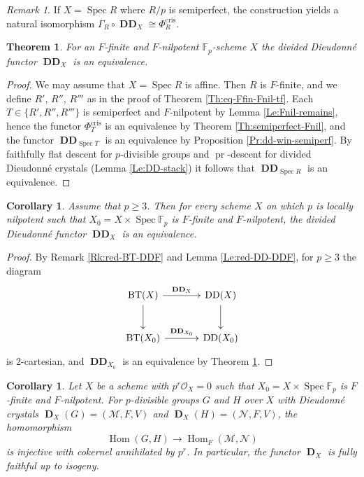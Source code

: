\documentclass[a4paper,11pt]{article}
\theoremstyle{plain}
\newtheorem{Thm}[Lemma]{Theorem}
\newtheorem{Cor}[Lemma]{Corollary}
\theoremstyle{definition}
\theoremstyle{remark}
\newtheorem{Remark}[Lemma]{Remark}
\theoremstyle{definition}
\numberwithin{Lemma}{section}
\numberwithin{Subpoint}{Lemma}
\numberwithin{equation}{section}
\newcommand{\MMM}{\mathcal{M}}
\newcommand{\NNN}{\mathcal{N}}
\newcommand{\OOO}{\mathcal{O}}
\newcommand{\DD}{{\mathbb{D}}}
\newcommand{\FF}{{\mathbb{F}}}
\DeclareMathOperator{\BT}{BT}
\DeclareMathOperator{\Dfun}{\mathbf D} %
\DeclareMathOperator{\DDcat}{DD}
\DeclareMathOperator{\DDfun}{\mathbf {DD}} %
\DeclareMathOperator{\Hom}{Hom}
\DeclareMathOperator{\Spec}{Spec}
\DeclareMathOperator{\cris}{cris}
\newcommand{\nameoftop}{{\operatorname{pr}}}
\newcommand{\chang}[1]{{#1}}
\begin{document}
\begin{Remark}
\chang{If $X=\Spec R$ where $R/p$ is semiperfect, the construction yields a natural isomorphism $\Gamma_R\circ\DDfun_X\cong\Phi_R^{\cris}$.}
\end{Remark}

\begin{Thm}
\label{Th:Ffin-Fnil}
For an $F$-finite and $F$-nilpotent $\FF_p$-scheme $X$
the divided Dieudonn\'e functor\/ $\DDfun_X$ is an equivalence.
\end{Thm}

\begin{proof}
We \chang{may} assume that $X=\Spec R$ \chang{is affine}.
\chang{Then $R$ is $F$-finite, and we define $R'$, $R''$, $R'''$ 
as in the proof of Theorem \ref{Th:eq-Ffin-Fnil-tf}.}
Each $T\in\{R',R'',R'''\}$ 
is semiperfect and $F$-nilpotent by Lemma \ref{Le:Fnil-remains}, 
hence the functor $\Phi_T^{\cris}$ is an equivalence 
by Theorem \ref{Th:semiperfect-Fnil},
and the functor $\DDfun_{\Spec T}$ is an equivalence
by Proposition \ref{Pr:dd-win-semiperf}.
By faithfully flat descent for $p$-divisible groups
and $\nameoftop$-descent for divided Dieudonn\'e crystals
(Lemma \ref{Le:DD-stack}) it follows that $\DDfun_{\Spec R}$
is an equivalence.
\end{proof}

\begin{Cor}
\label{Co:Ffin-Fnil}
Assume that $p\ge 3$.
Then for every scheme $X$ on which $p$ is locally nilpotent 
such that $X_0=X\times\Spec\FF_p$ is $F$-finite and $F$-nilpotent,
the divided Dieudonn\'e functor $\DDfun_X$ is an equivalence.
\end{Cor}

\begin{proof}
By Remark \ref{Rk:red-BT-DDF} and Lemma \ref{Le:red-DD-DDF},
for $p\ge 3$ the diagram
\[
\xymatrix@M+0.2em@C+1em{
\BT(X) \ar[r]^{\DDfun_X} \ar[d] &
\DDcat(X) \ar[d] \\
\BT(X_0) \ar[r]^{\DDfun_{X_0}} &
\DDcat(X_0)
}
\]
is $2$-cartesian, 
and $\DDfun_{X_0}$ is an equivalence by Theorem \ref{Th:Ffin-Fnil}. 
\end{proof}

\begin{Cor}
\label{Co:Isogeny}
Let $X$ be a scheme with $p^r\OOO_X=0$ 
such that $X_0=X\times\Spec\FF_p$ 
is $F$-finite and $F$-nilpotent.
For $p$-divisible groups $G$ and $H$ over $X$ with Dieudonn\'e crystals 
$\Dfun_X(G)=(\MMM,F,V)$ and\/ $\Dfun_X(H)=(\NNN,F,V)$, 
the homomorphism 
\begin{equation}
\label{Eq:HomGHMN}
\Hom(G,H)\to\Hom_F(\MMM,\NNN)
\end{equation}
is injective with cokernel annihilated by $p^r$.
In particular, the functor\/ $\Dfun_X$ is fully faithful up to isogeny.
\end{Cor}
\end{document}
